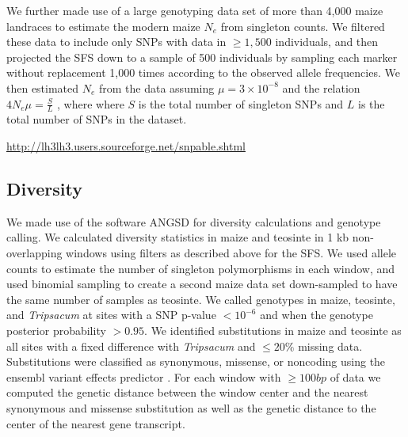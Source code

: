 \documentclass{pnastwo}
\begin{document}
\begin{article}
\begin{materials}
We further made use of a large genotyping data set of more than 4,000 maize landraces \cite{Hearne2015} to estimate the modern maize $N_e$ from singleton counts.
We filtered these data to include only SNPs with data in $\geq 1,500$ individuals, and then projected the SFS down to a sample of 500 individuals by sampling each marker without replacement 1,000 times according to the observed allele frequencies.
We then estimated $N_e$ from the data assuming $\mu = 3 \times 10^{-8}$ \cite{clark2005} and the relation  $4N_e\mu = \frac{S}{L}$ \cite{fu1993}, where where $S$ is the total number of singleton SNPs and $L$ is the total number of SNPs in the dataset.

\DIFdelbegin {}\DIFdelend \DIFaddbegin {}\url{http://lh3lh3.users.sourceforge.net/snpable.shtml}\DIFaddend 

\subsection{Diversity}
We made use of the software ANGSD \cite{korneliussen2014} for diversity calculations and genotype calling. 
We calculated diversity statistics in maize and teosinte in 1 kb non-overlapping windows using filters as described above for the SFS. 
We used allele counts to estimate the number of singleton polymorphisms in each window, and used binomial sampling to create a second maize data set down-sampled to have the same number of samples as teosinte.
We called genotypes in maize, teosinte, and \emph{Tripsacum} at sites with a SNP p-value $<10^{-6}$ and when the genotype posterior probability $>0.95$.
We identified substitutions in maize and teosinte as all sites with a fixed difference with \emph{Tripsacum} and $\leq 20\%$ missing data. 
Substitutions were classified as synonymous, missense, or noncoding using the ensembl variant effects predictor \cite{mclaren2010}.
For each window with $\geq 100bp$ of data we computed the genetic distance between the window center and the nearest synonymous and missense substitution as well as the genetic distance to the center of the nearest gene transcript.  


\end{materials}
\end{article}
\end{document}
